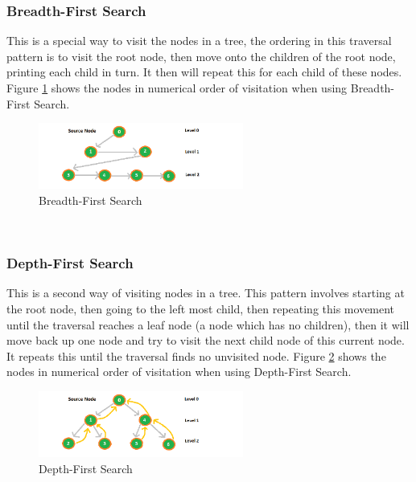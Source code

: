 \documentclass[10pt,twocolumn]{IEEEtran}
\begin{document}
\subsubsection{Breadth-First Search}
This is a special way to visit the nodes in a tree, the ordering in this traversal pattern is to visit the root node, then move onto the children of the root node, printing each child in turn. It then will repeat this for each child of these nodes. Figure \ref{fig:breadth} shows the nodes in numerical order of visitation when using Breadth-First Search. \\
\begin{figure}[h]
\includegraphics[width=0.6\textwidth]{bfs.png}
\caption{Breadth-First Search}
\label{fig:breadth}
\end{figure}
 \\
\subsubsection{Depth-First Search}
This is a second way of visiting nodes in a tree. This pattern involves starting at the root node, then going to the left most child, then repeating this movement until the traversal reaches a leaf node (a node which has no children), then it will move back up one node and try to visit the next child node of this current node. It repeats this until the traversal finds no unvisited node. Figure \ref{fig:depth} shows the nodes in numerical order of visitation when using Depth-First Search. 
\begin{figure}[h]
\includegraphics[width=0.6\textwidth]{dfs.png}
\caption{Depth-First Search}
\label{fig:depth}
\end{figure}
\end{document}
